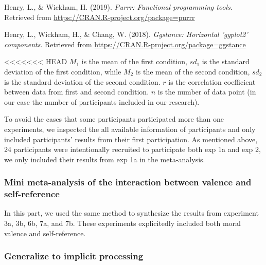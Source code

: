 \documentclass[
  man]{apa6}
\begin{document}
\leavevmode\hypertarget{ref-R-purrr}{}%
Henry, L., \& Wickham, H. (2019). \emph{Purrr: Functional programming tools}. Retrieved from \url{https://CRAN.R-project.org/package=purrr}

\leavevmode\hypertarget{ref-R-ggstance}{}%
Henry, L., Wickham, H., \& Chang, W. (2018). \emph{Ggstance: Horizontal 'ggplot2' components}. Retrieved from \url{https://CRAN.R-project.org/package=ggstance}

<<<<<<< HEAD
\(M_1\) is the mean of the first condition, \(sd_1\) is the standard deviation of the first condition, while \(M_2\) is the mean of the second condition, \(sd_2\) is the standard deviation of the second condition. \(r\) is the correlation coefficient between data from first and second condition. \(n\) is the number of data point (in our case the number of participants included in our research).

To avoid the cases that some participants participated more than one experiments, we inspected the all available information of participants and only included participants' results from their first participation. As mentioned above, 24 participants were intentionally recruited to participate both exp 1a and exp 2, we only included their results from exp 1a in the meta-analysis.

\hypertarget{mini-meta-analysis-of-the-interaction-between-valence-and-self-reference}{%
\subsubsection{Mini meta-analysis of the interaction between valence and self-reference}\label{mini-meta-analysis-of-the-interaction-between-valence-and-self-reference}}

In this part, we used the same method to synthesize the results from experiment 3a, 3b, 6b, 7a, and 7b. These experiments explicitedly included both moral valence and self-reference.

\hypertarget{generalize-to-implicit-processing}{%
\subsubsection{Generalize to implicit processing}\label{generalize-to-implicit-processing}}
\end{document}
